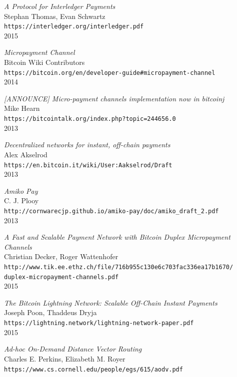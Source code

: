 \documentclass[a4paper]{article}
\begin{document}
\begin{thebibliography}{99}

\emph{A Protocol for Interledger Payments}\\
Stephan Thomas, Evan Schwartz\\
\texttt{https://interledger.org/interledger.pdf}\\
2015

\emph{Micropayment Channel}\\
Bitcoin Wiki Contributors\\
\texttt{https://bitcoin.org/en/developer-guide\#micropayment-channel}\\
2014

\emph{[ANNOUNCE] Micro-payment channels implementation now in bitcoinj}\\
Mike Hearn\\
\texttt{https://bitcointalk.org/index.php?topic=244656.0}\\
2013

\emph{Decentralized networks for instant, off-chain payments}\\
Alex Akselrod\\
\texttt{https://en.bitcoin.it/wiki/User:Aakselrod/Draft}\\
2013

\emph{Amiko Pay}\\
C. J. Plooy\\
\texttt{http://cornwarecjp.github.io/amiko-pay/doc/amiko\_draft\_2.pdf}\\
2013

\emph{A Fast and Scalable Payment Network with Bitcoin Duplex Micropayment Channels}\\
Christian Decker, Roger Wattenhofer\\
\texttt{http://www.tik.ee.ethz.ch/file/716b955c130e6c703fac336ea17b1670/\\duplex-micropayment-channels.pdf}\\
2015

\emph{The Bitcoin Lightning Network: Scalable Off-Chain Instant Payments}\\
Joseph Poon, Thaddeus Dryja\\
\texttt{https://lightning.network/lightning-network-paper.pdf}\\
2015

\emph{Ad-hoc On-Demand Distance Vector Routing}\\
Charles E. Perkins, Elizabeth M. Royer\\
\texttt{https://www.cs.cornell.edu/people/egs/615/aodv.pdf}\\


\end{thebibliography}
\end{document}
